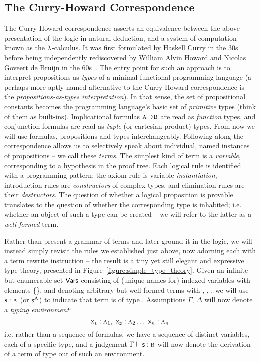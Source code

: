 \subsection{The Curry-Howard Correspondence}
The Curry-Howard correspondence asserts an equivalence between the above presentation of the logic in natural deduction, and a system of computation known as the $\mathnormal{\lambda}$-calculus.
It was first formulated by Haskell Curry in the 30s before being independently rediscovered by William Alvin Howard and Nicolas Goveert de Bruijn in the 60s~\cite{curry1934functionality,de1983automath,howard1980formulae}.
The entry point for such an approach is to interpret propositions as \textit{types} of a minimal functional programming language (a perhaps more aptly named alternative to the Curry-Howard correspondence is the \textit{propositions-as-types interpretation}).
In that sense, the set of propositional constants \propcon{} becomes the programming language's basic set of \textit{primitive} types (think of them as built-ins).
Implicational formulas $\smallprop{a} \ii \smallprop{b}$ are read as \textit{function} types, and conjunction formulas are read as \textit{tuple} (or cartesian product) types.
From now we will use formulas, propositions and types interchangeably.
Following along the correspondence allows us to selectively speak about individual, named instances of propositions -- we call these \textit{terms}.
The simplest kind of term is a \textit{variable}, corresponding to a hypothesis in the proof tree.
Each logical rule is identified with a programming pattern: the axiom rule is variable \textit{instantiation}, introduction rules are \textit{constructors} of complex types, and elimination rules are their \textit{destructors}.
The question of whether a logical proposition is provable translates to the question of whether the corresponding type is inhabited; i.e. whether an object of such a type can be created -- we will refer to the latter as a \textit{well-formed} term.

Rather than present a grammar of terms and later ground it in the logic, we will instead simply revisit the rules we established just above, now adorning each with a term rewrite instruction -- the result is a tiny yet still elegant and expressive type theory, presented in Figure~\ref{figure:simple_type_theory}.
Given an infinite but enumerable set $\mathsf{Vars}$ consisting of (unique names for) indexed variables with elements \{\term{\vari, \varj, \vark, \varl, \dots}\}, and denoting arbitrary but well-formed terms with , , , we will use $\mathsf{s}: \normalfont\textsc{a}$ (or $\mathsf{s}^{\normalfont\textsc{A}}$) to indicate that term  is of type .
Assumptions $\Gamma$, $\Delta$ will now denote a \textit{typing environment}:
\begin{equation}
\Var{1} : \prop a_1 ,~  \Var{2} : \prop a_2 \dots ~ \Var{n} : \prop a_n
\end{equation}
i.e. rather than a sequence of formulas, we have a sequence of distinct variables, each of a specific type, and a judgement $\Gamma \vdash \term{s} : \prop{b}$ will now denote the derivation of a term  of type  out of such an environment.

